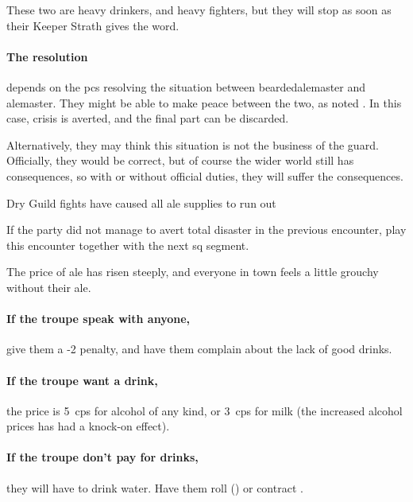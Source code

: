 
These two are heavy drinkers, and heavy fighters, but they will stop as soon as their Keeper Strath gives the word.


\paragraph{The resolution}
depends on the \glspl{pc} resolving the situation between \gls{beardedalemaster} and \gls{alemaster}.
They might be able to make peace between the two, as noted .
In this case, crisis is averted, and the final part can be discarded.

Alternatively, they may think this situation is not the business of the \gls{guard}.
Officially, they would be correct, but of course the wider world still has consequences, so with or without official duties, they will suffer the consequences.

\beardedalemaster

{\squash Dry}%
{Guild fights have caused all ale supplies to run out}%

If the party did not manage to avert total disaster in the previous encounter, play this encounter together with the next \gls{sq} \gls{segment}.

The price of ale has risen steeply, and everyone in \gls{town} feels a little grouchy without their ale.

\paragraph{If the troupe speak with anyone,}
give them a -2 penalty, and have them complain about the lack of good drinks.

\paragraph{If the troupe want a drink,}
the price is 5~\glspl{cp} for alcohol of any kind, or 3~\glspl{cp} for milk (the increased alcohol prices has had a knock-on effect).

\paragraph{If the troupe don't pay for drinks,}
they will have to drink water.
Have them roll  (\tn[10]) or contract \iftoggle{judgement}{Spychoke\exRef{judgement}{Judgement}{diseases}}{a nasty disease}.
